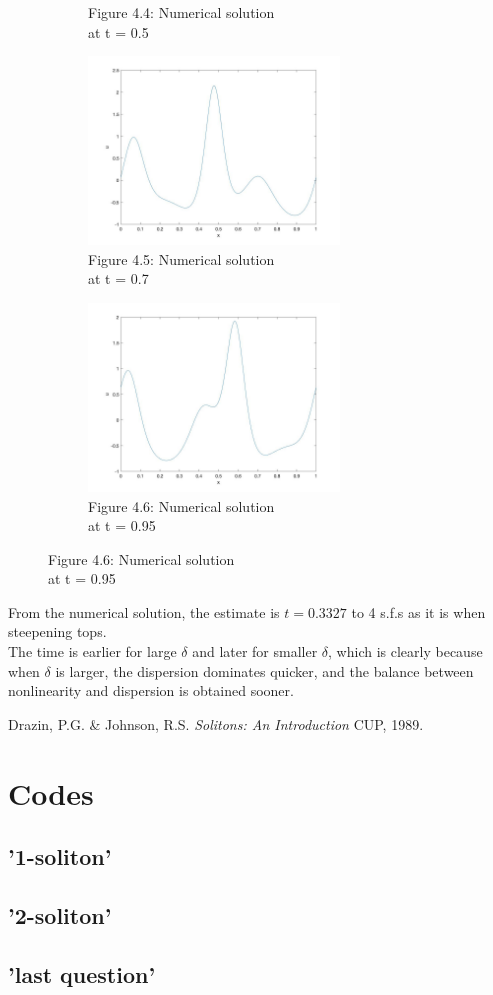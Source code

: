 \documentclass[a4paper,11pt]{article}
\begin{document}
\begin{figure}[H]
\begin{subfigure}{0.5\textwidth}
\caption{Figure 4.4: Numerical solution \\at t = 0.5}
\label{Q4(4)}
\end{subfigure}
\begin{subfigure}{0.5\textwidth}
\includegraphics[width = \linewidth, height = 5cm]{Q4(2).jpg}
\caption{Figure 4.5: Numerical solution \\at t = 0.7}
\label{Q4(5)}
\end{subfigure}
\begin{subfigure}{0.5\textwidth}
\includegraphics[width = \linewidth, height = 5cm]{Q4(1).jpg}
\caption{Figure 4.6: Numerical solution \\at t = 0.95 }
\label{Q4(6)}
\end{subfigure}
\end{figure}
From the numerical solution, the estimate is $t = 0.3327$ to 4 s.f.s as it is when steepening tops. \\
The time is earlier for large $\delta$ and later for smaller $\delta$, which is clearly because when $\delta$ is larger, the dispersion dominates quicker, and the balance between nonlinearity and dispersion is obtained sooner.

\begin{thebibliography}{9}
Drazin, P.G. \& Johnson, R.S.
\textit{Solitons: An Introduction} 
CUP, 1989.
\end{thebibliography}
\newpage
\appendix
\section{Codes}
\subsection*{'1-soliton'}
\label{P1}

\subsection*{'2-soliton'}
\label{P2}

\subsection*{'last question'}
\label{P3}

\end{document}
